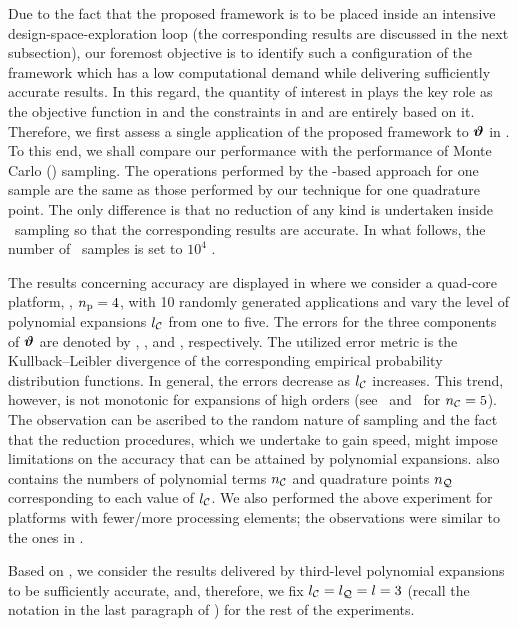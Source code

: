 Due to the fact that the proposed framework is to be placed inside an intensive design-space-exploration loop (the corresponding results are discussed in the next subsection), our foremost objective is to identify such a configuration of the framework which has a low computational demand while delivering sufficiently accurate results.
In this regard, the quantity of interest in  plays the key role as the objective function in  and the constraints in  and  are entirely based on it.
Therefore, we first assess a single application of the proposed framework to $\bm{\vartheta}$ in .
To this end, we shall compare our performance with the performance of Monte Carlo (\MC) sampling.
The operations performed by the \MC-based approach for one sample are the same as those performed by our technique for one quadrature point.
The only difference is that no reduction of any kind is undertaken inside \MC\ sampling so that the corresponding results are accurate.
In what follows, the number of \MC\ samples is set to $10^4$ \cite{ukhov2014, lee2013, juan2012, xiang2010}.


The results concerning accuracy are displayed in  where we consider a quad-core platform, \ie, ${n_\text{p}} = 4$, with 10 randomly generated applications and vary the level of polynomial expansions ${l_\mathcal{C}}$ from one to five.
The errors for the three components of $\bm{\vartheta}$ are denoted by \errorE, \errorQ, and \errorT, respectively.
The utilized error metric is the Kullback--Leibler divergence of the corresponding empirical probability distribution functions.
In general, the errors decrease as ${l_\mathcal{C}}$ increases.
This trend, however, is not monotonic for expansions of high orders (see \errorQ\ and \errorT\ for ${n_\mathcal{C}} = 5$).
The observation can be ascribed to the random nature of sampling and the fact that the reduction procedures, which we undertake to gain speed, might impose limitations on the accuracy that can be attained by polynomial expansions.
 also contains the numbers of polynomial terms ${n_\mathcal{C}}$ and quadrature points ${n_\mathcal{Q}}$ corresponding to each value of ${l_\mathcal{C}}$.
We also performed the above experiment for platforms with fewer/more processing elements; the observations were similar to the ones in .

Based on , we consider the results delivered by third-level polynomial expansions to be sufficiently accurate, and, therefore, we fix ${l_\mathcal{C}} = {l_\mathcal{Q}} = l = 3$ (recall the notation in the last paragraph of ) for the rest of the experiments.

